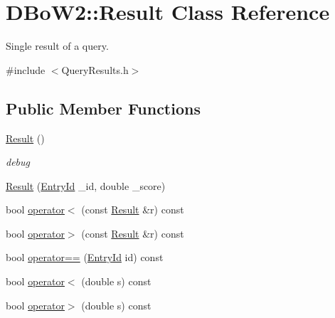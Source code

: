 \hypertarget{classDBoW2_1_1Result}{}\section{D\+Bo\+W2\+:\+:Result Class Reference}
\label{classDBoW2_1_1Result}


Single result of a query.  




{\ttfamily \#include $<$Query\+Results.\+h$>$}

\subsection*{Public Member Functions}
\begin{DoxyCompactItemize}
\item 
\hyperlink{classDBoW2_1_1Result_a3cd1ea537745f0f76042d08033629f4a}{Result} ()
\begin{DoxyCompactList}\small\item\em debug \end{DoxyCompactList}\item 
\hyperlink{classDBoW2_1_1Result_a5ca2977e7a2646f886ef92cb7f64352a}{Result} (\hyperlink{namespaceDBoW2_a060a36cf320e6e831ee98915c19c1623}{Entry\+Id} \+\_\+id, double \+\_\+score)
\item 
bool \hyperlink{classDBoW2_1_1Result_a9157d6fdd9be3dcf83a17376cc702fbf}{operator$<$} (const \hyperlink{classDBoW2_1_1Result}{Result} \&r) const
\item 
bool \hyperlink{classDBoW2_1_1Result_ac1cfd096bf01d496af84f56a8b98fce7}{operator$>$} (const \hyperlink{classDBoW2_1_1Result}{Result} \&r) const
\item 
bool \hyperlink{classDBoW2_1_1Result_ab5419fc64d70cb15becfd982703cbde8}{operator==} (\hyperlink{namespaceDBoW2_a060a36cf320e6e831ee98915c19c1623}{Entry\+Id} id) const
\item 
bool \hyperlink{classDBoW2_1_1Result_a930763f8645ee57a71835b7d9fa05ebc}{operator$<$} (double s) const
\item 
bool \hyperlink{classDBoW2_1_1Result_a8618ccee54d229acc47a419b1262f08f}{operator$>$} (double s) const
\end{DoxyCompactItemize}
